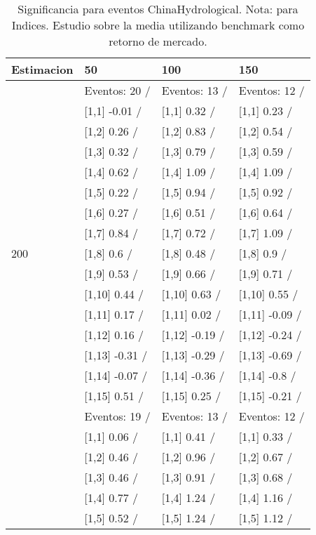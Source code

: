 \begin{table}

\caption{Significancia para eventos ChinaHydrological. Nota: para Indices. Estudio sobre la media utilizando benchmark como retorno de mercado.}
\centering
\begin{tabular}[t]{llll}
\toprule
Estimacion & 50 & 100 & 150\\
\midrule
 & Eventos:  20 / & Eventos:  13 / & Eventos:  12 /\\
 & {}[1,1] -0.01  / & {}[1,1] 0.32  / & {}[1,1] 0.23  /\\
 & {}[1,2] 0.26  / & {}[1,2] 0.83  / & {}[1,2] 0.54  /\\
 & {}[1,3] 0.32  / & {}[1,3] 0.79  / & {}[1,3] 0.59  /\\
 & {}[1,4] 0.62  / & {}[1,4] 1.09  / & {}[1,4] 1.09  /\\
\addlinespace
 & {}[1,5] 0.22  / & {}[1,5] 0.94  / & {}[1,5] 0.92  /\\
 & {}[1,6] 0.27  / & {}[1,6] 0.51  / & {}[1,6] 0.64  /\\
 & {}[1,7] 0.84  / & {}[1,7] 0.72  / & {}[1,7] 1.09  /\\
200 & {}[1,8] 0.6  / & {}[1,8] 0.48  / & {}[1,8] 0.9  /\\
 & {}[1,9] 0.53  / & {}[1,9] 0.66  / & {}[1,9] 0.71  /\\
\addlinespace
 & {}[1,10] 0.44  / & {}[1,10] 0.63  / & {}[1,10] 0.55  /\\
 & {}[1,11] 0.17  / & {}[1,11] 0.02  / & {}[1,11] -0.09  /\\
 & {}[1,12] 0.16  / & {}[1,12] -0.19  / & {}[1,12] -0.24  /\\
 & {}[1,13] -0.31  / & {}[1,13] -0.29  / & {}[1,13] -0.69  /\\
 & {}[1,14] -0.07  / & {}[1,14] -0.36  / & {}[1,14] -0.8  /\\
\addlinespace
 & {}[1,15] 0.51  / & {}[1,15] 0.25  / & {}[1,15] -0.21  /\\
 & Eventos:  19 / & Eventos:  13 / & Eventos:  12 /\\
 & {}[1,1] 0.06  / & {}[1,1] 0.41  / & {}[1,1] 0.33  /\\
 & {}[1,2] 0.46  / & {}[1,2] 0.96  / & {}[1,2] 0.67  /\\
 & {}[1,3] 0.46  / & {}[1,3] 0.91  / & {}[1,3] 0.68  /\\
\addlinespace
 & {}[1,4] 0.77  / & {}[1,4] 1.24  / & {}[1,4] 1.16  /\\
 & {}[1,5] 0.52  / & {}[1,5] 1.24  / & {}[1,5] 1.12  /\\

\end{tabular}
\end{table}
